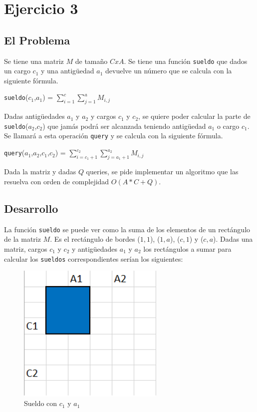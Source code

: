 \section{Ejercicio 3}
\subsection{El Problema}
Se tiene una matriz $M$ de tamaño $CxA$. Se tiene una función \texttt{sueldo} que dados un cargo $c_1$ y una antigüedad $a_1$ devuelve un número que se calcula con la siguiente fórmula.

\texttt{sueldo}($c_1$,$a_1$) = $\sum_{i=1}^{c} \sum_{j=1}^{a} M_{i,j}$

Dadas antigüedades $a_1$ y $a_2$ y cargos $c_1$ y $c_2$, se quiere poder calcular la parte de \texttt{sueldo}($a_2$,$c_2$) que jamás podrá ser alcanzada teniendo antigüedad $a_1$ o cargo $c_1$. Se llamará a esta operación \texttt{query} y se calcula con la siguiente fórmula.

\texttt{query}($a_1$,$a_2$,$c_1$,$c_2$) = $\sum_{i=c_1+1}^{c_2} \sum_{j=a_1+1}^{a_2} M_{i,j}$

Dada la matriz y dadas $Q$ queries, se pide implementar un algoritmo que las resuelva con orden de complejidad $O(A*C + Q)$.

\subsection{Desarrollo}

La función \texttt{sueldo} se puede ver como la suma de los elementos de un rectángulo de la matriz $M$. Es el rectángulo de bordes ($1,1$), ($1,a$), ($c,1$) y ($c,a$). Dadas una matriz, cargos $c_1$ y $c_2$ y antigüedades $a_1$ y $a_2$ los rectángulos a sumar para calcular los \texttt{sueldos} correspondientes serían los siguientes:

\begin{figure}[H]
\centering
\includegraphics[width=7cm]{Imagenes/Ej3b.png}
\caption{Sueldo con $c_1$ y $a_1$}
\end{figure}


